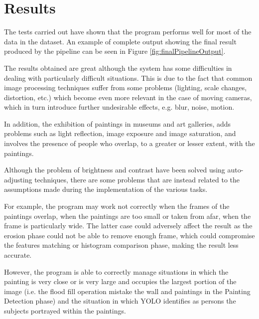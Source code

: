 \documentclass[10pt,twocolumn,letterpaper]{article}
\begin{document}
\section{Results}

\begin{figure*}
   \begin{center}
   \fbox{\rule{0pt}{2in} \rule{.9\linewidth}{0pt}}
   \end{center}
      \caption{Example of final output produced by the proposed pipeline.}
   \label{fig:finalPipelineOutput}
\end{figure*}

The tests carried out have shown that the program performs well for most of the data in the dataset. An example of complete output showing the final result produced by the pipeline can be seen in Figure \ref{fig:finalPipelineOutput}.

The results obtained are great although the system has some difficulties in dealing with particularly difficult situations. This is due to the fact that common image processing techniques suffer from some problems (lighting, scale changes, distortion, etc.) which become even more relevant in the case of moving cameras, which in turn introduce further undesirable effects, e.g. blur, noise, motion.

In addition, the exhibition of paintings in museums and art galleries, adds problems such as light reflection, image exposure and image saturation, and involves the presence of people who overlap, to a greater or lesser extent, with the paintings.

Although the problem of brightness and contrast have been solved using auto-adjusting techniques, there are some problems that are instead related to the assumptions made during the implementation of the various tasks.

For example, the program may work not correctly when the frames of the paintings overlap, when the paintings are too small or taken from afar, when the frame is particularly wide. The latter case could adversely affect the result as the erosion phase could not be able to remove enough frame, which could compromise the features matching or histogram comparison phase, making the result less accurate.

However, the program is able to correctly manage situations in which the painting is very close or is very large and occupies the largest portion of the image (i.e. the flood fill operation mistake the wall and paintings in the Painting Detection phase) and the situation in which YOLO identifies as persons the subjects portrayed within the paintings.
\end{document}

